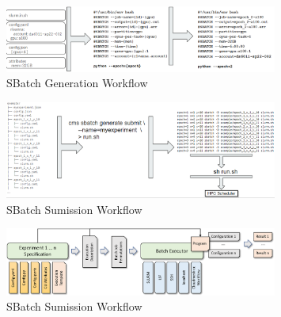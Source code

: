 \begin{figure}[p]
    \centering
    \includegraphics[width=0.8\textwidth]{images/sbatch-template.png}
    \caption{SBatch Generation Workflow}\label{fig:sbatch}
\end{figure}

\begin{figure}[p]
    \centering
    \includegraphics[width=0.8\textwidth]{images/sbatch-submit.png}
    \caption{SBatch Sumission Workflow}\label{fig:sbatch-submit}
\end{figure}



\begin{figure}[htb]
    \centering
    \includegraphics[width=0.8\textwidth]{images/sbatch.pdf}
    \caption{SBatch Sumission Workflow}\label{fig:sbatch-2}
\end{figure}


